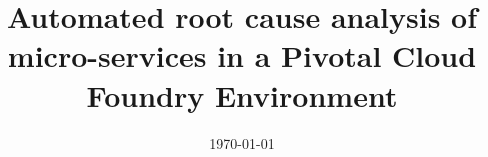 \documentclass[a4paper, 11pt, oneside]{thesis}  %
\begin{document}
\frontmatter      %

\title  {Automated root cause analysis of micro-services in a Pivotal Cloud Foundry Environment}
            
\addresses  {\groupname\\\deptname\\\univname}  %
\date       {\today}
\subject    {}
\keywords   {}

\maketitle


\fancyhead{}  %
\rhead{\thepage}  %
\lhead{}  %

\pagestyle{fancy}  %
\end{document}
